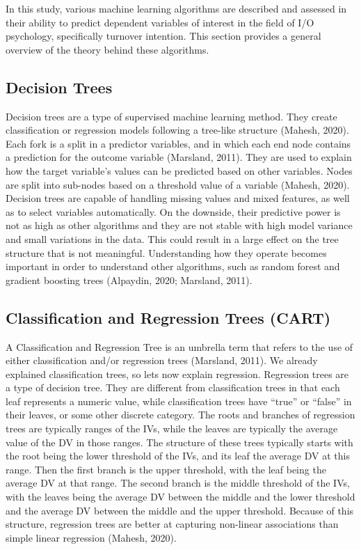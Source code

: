 \documentclass[
  jou]{apa6}
\begin{document}
In this study, various machine learning algorithms are described and assessed in their ability to predict dependent variables of interest in the field of I/O psychology, specifically turnover intention.
This section provides a general overview of the theory behind these algorithms.

\hypertarget{decision-trees}{%
\subsection{Decision Trees}\label{decision-trees}}

Decision trees are a type of supervised machine learning method.
They create classification or regression models following a tree-like structure (Mahesh, 2020).
Each fork is a split in a predictor variables, and in which each end node contains a prediction for the outcome variable (Marsland, 2011).
They are used to explain how the target variable's values can be predicted based on other variables.
Nodes are split into sub-nodes based on a threshold value of a variable (Mahesh, 2020).
Decision trees are capable of handling missing values and mixed features, as well as to select variables automatically.
On the downside, their predictive power is not as high as other algorithms and they are not stable with high model variance and small variations in the data.
This could result in a large effect on the tree structure that is not meaningful.
Understanding how they operate becomes important in order to understand other algorithms, such as random forest and gradient boosting trees (Alpaydin, 2020; Marsland, 2011).

\hypertarget{classification-and-regression-trees-cart}{%
\subsection{Classification and Regression Trees (CART)}\label{classification-and-regression-trees-cart}}

A Classification and Regression Tree is an umbrella term that refers to the use of either classification and/or regression trees (Marsland, 2011).
We already explained classification trees, so lets now explain regression.
Regression trees are a type of decision tree.
They are different from classification trees in that each leaf represents a numeric value, while classification trees have ``true'' or ``false'' in their leaves, or some other discrete category.
The roots and branches of regression trees are typically ranges of the IVs, while the leaves are typically the average value of the DV in those ranges.
The structure of these trees typically starts with the root being the lower threshold of the IVs, and its leaf the average DV at this range.
Then the first branch is the upper threshold, with the leaf being the average DV at that range.
The second branch is the middle threshold of the IVs, with the leaves being the average DV between the middle and the lower threshold and the average DV between the middle and the upper threshold.
Because of this structure, regression trees are better at capturing non-linear associations than simple linear regression (Mahesh, 2020).
\end{document}
